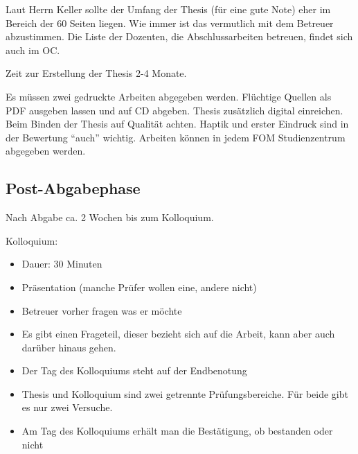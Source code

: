 Laut Herrn Keller sollte der Umfang der Thesis (für eine gute Note) eher im Bereich der 60 Seiten liegen. Wie immer ist das vermutlich mit dem Betreuer abzustimmen. Die Liste der Dozenten, die Abschlussarbeiten betreuen, findet sich auch im OC.

Zeit zur Erstellung der Thesis 2-4 Monate.

Es müssen zwei gedruckte Arbeiten abgegeben werden. Flüchtige Quellen als PDF ausgeben lassen und auf CD abgeben. Thesis zusätzlich digital einreichen. Beim Binden der Thesis auf Qualität achten. Haptik und erster Eindruck sind in der Bewertung \enquote{auch} wichtig. Arbeiten können in jedem FOM Studienzentrum abgegeben werden. 

\subsection{Post-Abgabephase}
Nach Abgabe ca. 2 Wochen bis zum Kolloquium.

Kolloquium:
\begin{itemize}
\item Dauer: 30 Minuten 
\item Präsentation (manche Prüfer wollen eine, andere nicht)
\item Betreuer vorher fragen was er möchte
\item Es gibt einen Frageteil, dieser bezieht sich auf die Arbeit, kann aber auch darüber hinaus gehen.
\item Der Tag des Kolloquiums steht auf der Endbenotung 
\item Thesis und Kolloquium sind zwei getrennte Prüfungsbereiche. Für beide gibt es nur zwei Versuche. 
\item Am Tag des Kolloquiums erhält man die Bestätigung, ob bestanden oder nicht
\end{itemize}
